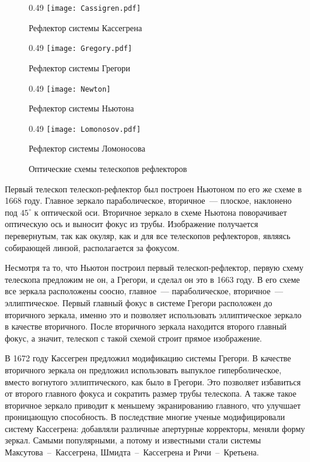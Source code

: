 \vspace{-.3pc}
\begin{figure}[h!]
    \begin{subcaptionblock}{0.49\tw}
        \texttt{[image: Cassigren.pdf]}
        \caption{Рефлектор системы Кассегрена}
    \end{subcaptionblock}
    \hfill
    \begin{subcaptionblock}{0.49\tw}
        \texttt{[image: Gregory.pdf]}
        \caption{Рефлектор системы Грегори}
        \label{Gregory}
    \end{subcaptionblock}
    \vskip4pt
    \begin{subcaptionblock}{0.49\tw}
        \texttt{[image: Newton]}
        \caption{Рефлектор системы Ньютона}
    \end{subcaptionblock}
    \hfill
    \begin{subcaptionblock}{0.49\tw}
        \texttt{[image: Lomonosov.pdf]}
        \caption{Рефлектор системы Ломоносова}
    \end{subcaptionblock}
    \caption{Оптические схемы телескопов рефлекторов}
\end{figure}

Первый телескоп телескоп-рефлектор был построен Ньютоном по его же схеме в 1668 году. Главное зеркало параболическое, вторичное~--- плоское, наклонено под $45^\circ$ к оптической оси. Вторичное зеркало в схеме Ньютона поворачивает оптическую ось и выносит фокус из трубы. Изображение получается перевернутым, так как окуляр, как и для все телескопов рефлекторов, являясь собирающей линзой, располагается за фокусом.

Несмотря та то, что Ньютон построил первый телескоп-рефлектор, первую схему телескопа предложим не он, а Грегори, и сделал он это в 1663 году. В его схеме все зеркала расположены соосно, главное~--- параболическое, вторичное~--- эллиптическое. Первый главный фокус в системе Грегори расположен до вторичного зеркала, именно это и позволяет использовать эллиптическое зеркало в качестве вторичного. После вторичного зеркала находится второго главный фокус, а значит, телескоп с такой схемой строит прямое изображение.

В 1672 году Кассегрен предложил модификацию системы Грегори. В качестве вторичного зеркала он предложил использовать выпуклое гиперболическое, вместо вогнутого эллиптического, как было в Грегори. Это позволяет избавиться от второго главного фокуса и сократить размер трубы телескопа. А также такое вторичное зеркало приводит к меньшему экранированию главного, что улучшает проницающую способность. В последствие многие ученые модифицировали систему Кассегрена: добавляли различные апертурные корректоры, меняли форму зеркал. Самыми популярными, а потому и известными стали системы Максутова~--~Кассегрена, Шмидта~--~Кассегрена и Ричи~--~Кретьена.

